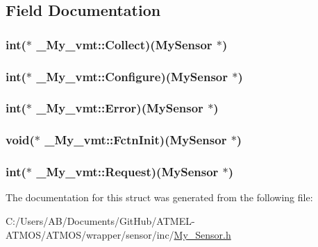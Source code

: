 \subsection{Field Documentation}
\hypertarget{struct___my__vmt_a886b58b662a06712e400abefd0d5d677}{
\subsubsection[{Collect}]{\setlength{\rightskip}{0pt plus 5cm}int($\ast$ \-\_\-\-My\-\_\-vmt\-::\-Collect)({\bf My\-Sensor} $\ast$)}}\label{struct___my__vmt_a886b58b662a06712e400abefd0d5d677}
\hypertarget{struct___my__vmt_ae66aa549ba7b48620e02989da56da5a5}{
\subsubsection[{Configure}]{\setlength{\rightskip}{0pt plus 5cm}int($\ast$ \-\_\-\-My\-\_\-vmt\-::\-Configure)({\bf My\-Sensor} $\ast$)}}\label{struct___my__vmt_ae66aa549ba7b48620e02989da56da5a5}
\hypertarget{struct___my__vmt_a7fd6e75b116d4744299ececa6286d274}{
\subsubsection[{Error}]{\setlength{\rightskip}{0pt plus 5cm}int($\ast$ \-\_\-\-My\-\_\-vmt\-::\-Error)({\bf My\-Sensor} $\ast$)}}\label{struct___my__vmt_a7fd6e75b116d4744299ececa6286d274}
\hypertarget{struct___my__vmt_a43f9f9d8e0c1d315836bb28612d18bee}{
\subsubsection[{Fctn\-Init}]{\setlength{\rightskip}{0pt plus 5cm}void($\ast$ \-\_\-\-My\-\_\-vmt\-::\-Fctn\-Init)({\bf My\-Sensor} $\ast$)}}\label{struct___my__vmt_a43f9f9d8e0c1d315836bb28612d18bee}
\hypertarget{struct___my__vmt_a2d1dad94e54417934087cf76a8e32245}{
\subsubsection[{Request}]{\setlength{\rightskip}{0pt plus 5cm}int($\ast$ \-\_\-\-My\-\_\-vmt\-::\-Request)({\bf My\-Sensor} $\ast$)}}\label{struct___my__vmt_a2d1dad94e54417934087cf76a8e32245}


The documentation for this struct was generated from the following file\-:\begin{DoxyCompactItemize}
\item 
C\-:/\-Users/\-A\-B/\-Documents/\-Git\-Hub/\-A\-T\-M\-E\-L-\/\-A\-T\-M\-O\-S/\-A\-T\-M\-O\-S/wrapper/sensor/inc/\hyperlink{_my___sensor_8h}{My\-\_\-\-Sensor.\-h}\end{DoxyCompactItemize}
